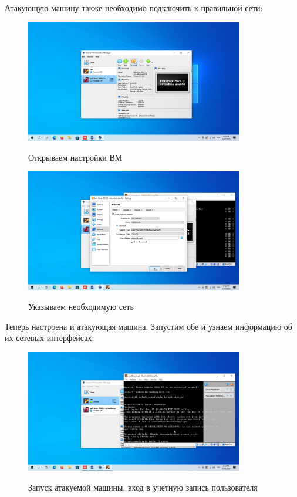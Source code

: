 \documentclass[a4paper]{article}
\begin{document}
  Атакующую машину также необходимо подключить к правильной сети:

  \begin{figure}[H]
    \centering
    \includegraphics[width=0.85\textwidth]{04_0015}
    \label{img:10}
    \caption{Открываем настройки ВМ}
  \end{figure}

  \begin{figure}[H]
    \centering
    \includegraphics[width=0.85\textwidth]{04_0030}
    \label{img:11}
    \caption{Указываем необходимую сеть}
  \end{figure}

  Теперь настроена и атакующая машина. Запустим обе и узнаем информацию об их сетевых интерфейсах:

  \begin{figure}[H]
    \centering
    \includegraphics[width=0.85\textwidth]{04_0032}
    \label{img:12}
    \caption{Запуск атакуемой машины, вход в учетную запись пользователя}
  \end{figure}
\end{document}
